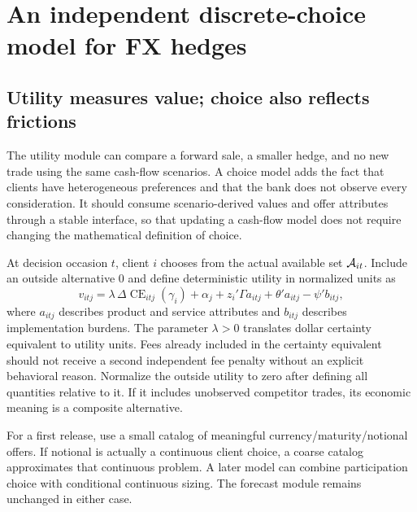 \chapter{An independent discrete-choice model for FX hedges}
\label{ch:choice}
\section{Utility measures value; choice also reflects frictions}
The utility module can compare a forward sale, a smaller hedge, and no new trade using the same cash-flow scenarios. A choice model adds the fact that clients have heterogeneous preferences and that the bank does not observe every consideration. It should consume scenario-derived values and offer attributes through a stable interface, so that updating a cash-flow model does not require changing the mathematical definition of choice.

At decision occasion $t$, client $i$ chooses from the actual available set $\mathcal A_{it}$. Include an outside alternative $0$ and define deterministic utility in normalized units as
\begin{equation}
v_{itj}=\lambda\,\Delta\operatorname{CE}_{itj}(\gamma_i)
+\alpha_j+z_i'\Gamma a_{itj}+\theta'a_{itj}-\psi'b_{itj},
\label{eq:choiceutility}
\end{equation}
where $a_{itj}$ describes product and service attributes and $b_{itj}$ describes implementation burdens. The parameter $\lambda>0$ translates dollar certainty equivalent to utility units. Fees already included in the certainty equivalent should not receive a second independent fee penalty without an explicit behavioral reason. Normalize the outside utility to zero after defining all quantities relative to it. If it includes unobserved competitor trades, its economic meaning is a composite alternative.

For a first release, use a small catalog of meaningful currency/maturity/notional offers. If notional is actually a continuous client choice, a coarse catalog approximates that continuous problem. A later model can combine participation choice with conditional continuous sizing. The forecast module remains unchanged in either case.


